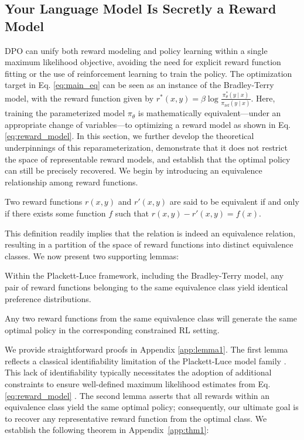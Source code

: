 \label{sec:theory}

\subsection{Your Language Model Is Secretly a Reward Model} DPO can unify both reward modeling and policy learning within a single maximum likelihood objective, avoiding the need for explicit reward function fitting or the use of reinforcement learning to train the policy. The optimization target in Eq. \ref{eq:main_eq} can be seen as an instance of the Bradley-Terry model, with the reward function given by $r^*(x, y) = \beta \log\frac{\pi^*_\theta(y \mid x)}{\pi_\text{ref}(y \mid x)}$. Here, training the parameterized model $\pi_{\theta}$ is mathematically equivalent—under an appropriate change of variables—to optimizing a reward model as shown in Eq. \ref{eq:reward_model}. In this section, we further develop the theoretical underpinnings of this reparameterization, demonstrate that it does not restrict the space of representable reward models, and establish that the optimal policy can still be precisely recovered. We begin by introducing an equivalence relationship among reward functions.

\begin{definition}
Two reward functions $r(x, y)$ and $r'(x, y)$ are said to be equivalent if and only if there exists some function $f$ such that $r(x, y) - r'(x, y) = f(x)$.     
\end{definition}

This definition readily implies that the relation is indeed an equivalence relation, resulting in a partition of the space of reward functions into distinct equivalence classes. We now present two supporting lemmas:

\begin{lemma}\label{lemma:same_prefrence}
Within the Plackett-Luce framework, including the Bradley-Terry model, any pair of reward functions belonging to the same equivalence class yield identical preference distributions.
\end{lemma}

\begin{lemma}\label{lemma:same_policy}
    Any two reward functions from the same equivalence class will generate the same optimal policy in the corresponding constrained RL setting.
\end{lemma}

We provide straightforward proofs in Appendix \ref{app:lemma1}. The first lemma reflects a classical identifiability limitation of the Plackett-Luce model family \cite{plackett1975analysis}. This lack of identifiability typically necessitates the adoption of additional constraints to ensure well-defined maximum likelihood estimates from Eq. \ref{eq:reward_model} \cite{bong2022generalized}. The second lemma asserts that all rewards within an equivalence class yield the same optimal policy; consequently, our ultimate goal is to recover any representative reward function from the optimal class. We establish the following theorem in Appendix~\ref{app:thm1}:

